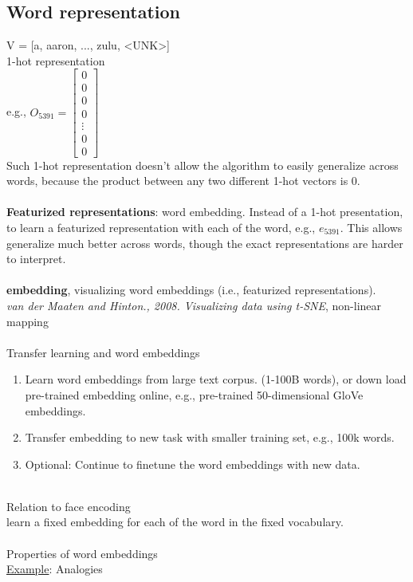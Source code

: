 %
\subsection{Word representation}
V = [a, aaron, ..., zulu, <UNK>]\\
1-hot representation\\
e.g., $O_{5391} = \begin{bmatrix}
0\\0\\0\\0\\ \vdots \\0\\0
\end{bmatrix}$\\
Such 1-hot representation doesn't allow the algorithm to easily generalize across words, because the product between any two different 1-hot vectors is 0.\\
\\
\textbf{Featurized representations}: word embedding. Instead of a 1-hot presentation, to learn a featurized representation with each of the word, e.g., $e_{5391}$. This allows generalize much better across words, though the exact representations are harder to interpret.\\
\\
\textbf{embedding}, visualizing word embeddings (i.e., featurized representations).\\
\textit{van der Maaten and Hinton., 2008. Visualizing data using t-SNE}, non-linear mapping\\
\\
Transfer learning and word embeddings
\begin{enumerate}
\item
Learn word embeddings from large text corpus. (1-100B words), or down load pre-trained embedding online, e.g., pre-trained 50-dimensional GloVe embeddings.
\item
Transfer embedding to new task with smaller training set, e.g., 100k words.
\item
Optional: Continue to finetune the word embeddings with new data.
\end{enumerate}
~\\
Relation to face encoding\\
learn a fixed embedding for each of the word in the fixed vocabulary.\\
\\
Properties of word embeddings\\
\underline{Example}: Analogies\\
